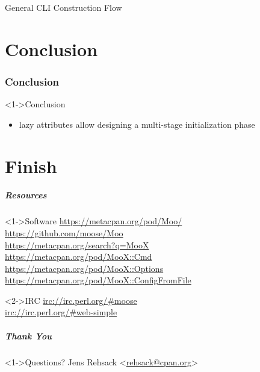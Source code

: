 \documentclass[ngerman,xcolor={table,dvipsnames},scriptsizeer,compress,hyperref={bookmarks,colorlinks}]{beamer}
\begin{document}
\begin{frame}[fragile]{General CLI Construction Flow}
\end{frame}


\part{Conclusion}

\section{Conclusion}

\begin{frame}[t,fragile]

\begin{block}<1->{Conclusion}
\begin{itemize}
\item lazy attributes allow designing a multi-stage initialization phase
\end{itemize}
\end{block}

\end{frame}






\part{Finish}

\begin{frame}[t,fragile]
\frametitle{Resources}
\begin{block}<1->{Software}
\url{https://metacpan.org/pod/Moo/} \\
\url{https://github.com/moose/Moo} \\
\url{https://metacpan.org/search?q=MooX} \\
\url{https://metacpan.org/pod/MooX::Cmd} \\
\url{https://metacpan.org/pod/MooX::Options} \\
\url{https://metacpan.org/pod/MooX::ConfigFromFile}
\end{block}

\begin{block}<2->{IRC}
\url{irc://irc.perl.org/#moose} \\
\url{irc://irc.perl.org/#web-simple}
\end{block}
\end{frame}

\begin{frame}[fragile]
\frametitle{Thank You}
\begin{block}<1->{Questions?}
Jens Rehsack \textless{}\href{mailto:rehsack@cpan.org}{rehsack@cpan.org}\textgreater{}
\end{block}
\end{frame}
\end{document}
